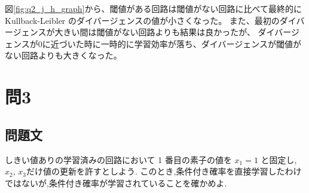 \documentclass[a4j, uplatex, fleqn, dvipdfmx]{jsarticle} %
\begin{document}
図\ref{fig:q2_j_h_graph}から、閾値がある回路は閾値がない回路に比べて最終的にKullback-Leibler のダイバージェンスの値が小さくなった。
また、最初のダイバージェンスが大きい間は閾値がない回路よりも結果は良かったが、
ダイバージェンスが0に近づいた時に一時的に学習効率が落ち、ダイバージェンスが閾値がない回路よりも大きくなった。

\section{問3}
\subsection{問題文}
しきい値ありの学習済みの回路において 1 番目の素子の値を $x_1 = 1$ と固定し, $x_2$, $x_3$だけ値の更新を許すとしよう.
このとき,条件付き確率を直接学習したわけではないが,条件付き確率が学習されていることを確かめよ.




\end{document}
